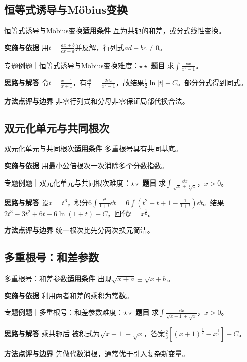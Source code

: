 \subsection{恒等式诱导与Möbius变换}\label{mat:integrals_methods:i19}
\begin{method}{恒等式诱导与Möbius变换}\textbf{适用条件} 互为共轭的和差，或分式线性变换。\par\textbf{实施与依据} 用$t=\frac{ax+b}{cx+d}$并反解，行列式$ad-bc\ne0$。\end{method}
\begin{example}{专题例题｜恒等式诱导与Möbius变换}{难度：$\star\star$}
\textbf{题目} 求$\int\frac{\dd x}{x^2-1}$。\par\textbf{思路与解答} 令$t=\frac{x-1}{x+1}$，有$\frac{\dd t}{t}=\frac{2\dd x}{x^2-1}$，故结果$\frac12\ln|t|+C$。部分分式得到同式。\par\textbf{方法点评与边界} 非零行列式和分母非零保证局部代换合法。
\end{example}
\subsection{双元化单元与共同根次}\label{mat:integrals_methods:i20}
\begin{method}{双元化单元与共同根次}\textbf{适用条件} 多重根号具有共同基底。\par\textbf{实施与依据} 用最小公倍根次一次消除多个分数指数。\end{method}
\begin{example}{专题例题｜双元化单元与共同根次}{难度：$\star\star$}
\textbf{题目} 求$\int\frac{\dd x}{\sqrt x+\sqrt[3]x}$，$x>0$。\par\textbf{思路与解答} 设$x=t^6$，积分$6\int \frac{t^3}{1+t}\dd t=6\int(t^2-t+1-\frac{1}{1+t})\dd t$。结果$2t^3-3t^2+6t-6\ln(1+t)+C$，回代$t=x^{\frac{1}{6}}$。\par\textbf{方法点评与边界} 统一根次比先分两次换元简洁。
\end{example}
\subsection{多重根号：和差参数}\label{mat:integrals_methods:i21}
\begin{method}{多重根号：和差参数}\textbf{适用条件} 出现$\sqrt{x+a}\pm\sqrt{x+b}$。\par\textbf{实施与依据} 利用两者和差的乘积为常数。\end{method}
\begin{example}{专题例题｜多重根号：和差参数}{难度：$\star\star$}
\textbf{题目} 求$\int\frac{\dd x}{\sqrt{x+1}+\sqrt x}$，$x>0$。\par\textbf{思路与解答} 乘共轭后 被积式为$\sqrt{x+1}-\sqrt x$，答案$\frac23[(x+1)^{\frac{3}{2}}-x^{\frac{3}{2}}]+C$。\par\textbf{方法点评与边界} 先做代数消根，通常优于引入复杂新变量。
\end{example}
